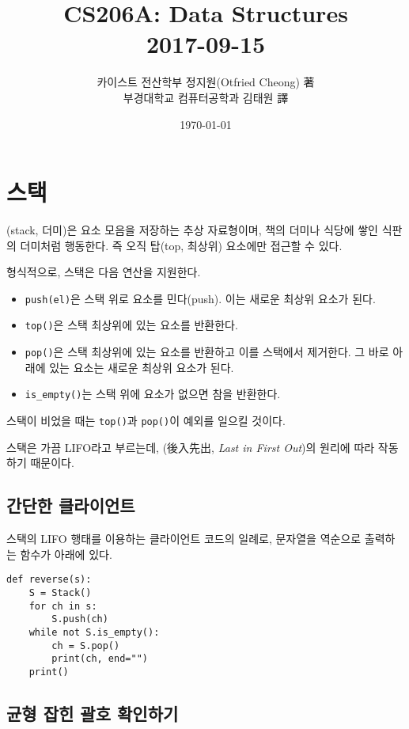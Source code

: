 \documentclass[a4paper, chapter]{oblivoir}
\title{CS206A: Data Structures\\2017-09-15}
\author{카이스트 전산학부 정지원(Otfried Cheong) 著\\부경대학교 컴퓨터공학과 김태원 譯}
\date{\today}
\begin{document}
\maketitle

\chapter*{스택}

(stack, 더미)은 요소 모음을 저장하는 추상 자료형이며, 책의 더미나 식당에 쌓인 식판의 더미처럼 행동한다. 즉 오직 탑(top, 최상위) 요소에만 접근할 수 있다.

형식적으로, 스택은 다음 연산을 지원한다.

\begin{itemize}
    \setlength\itemsep{-0.5em}
    \item \texttt{push(el)}은 스택 위로 요소를 민다(push). 이는 새로운 최상위 요소가 된다.
    \item \texttt{top()}은 스택 최상위에 있는 요소를 반환한다.
    \item \texttt{pop()}은 스택 최상위에 있는 요소를 반환하고 이를 스택에서 제거한다. 그 바로 아래에 있는 요소는 새로운 최상위 요소가 된다.
    \item \texttt{is\_empty()}는 스택 위에 요소가 없으면 참을 반환한다.
\end{itemize}

스택이 비었을 때는 \texttt{top()}과 \texttt{pop()}이 예외를 일으킬 것이다. 

스택은 가끔 LIFO라고 부르는데, (後入先出, \emph{Last in First Out})의 원리에 따라 작동하기 때문이다.

\section*{간단한 클라이언트}

스택의 LIFO 행태를 이용하는 클라이언트 코드의 일례로, 문자열을 역순으로 출력하는 함수가 아래에 있다.

\begin{verbatim}
def reverse(s):
    S = Stack()
    for ch in s:
        S.push(ch)
    while not S.is_empty():
        ch = S.pop()
        print(ch, end="")
    print()
\end{verbatim}

\section*{균형 잡힌 괄호 확인하기}
\end{document}
